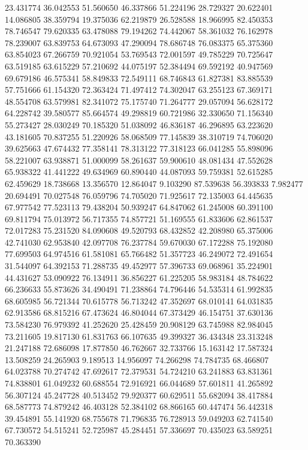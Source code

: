 23.431774
36.042553
51.560650
46.337866
51.224196
28.729327
20.622401
14.086805
38.359794
19.375036
62.219879
26.528588
18.966995
82.450353
78.746547
79.620335
63.478088
79.194262
74.442067
58.361032
76.162978
78.239007
63.839753
64.673093
47.290094
78.686748
76.083375
65.375360
63.854023
67.266759
70.921054
53.769543
72.001597
49.785229
70.725647
63.519185
63.615229
57.210692
44.075197
52.384494
69.592192
40.947569
69.679186
46.575341
58.849833
72.549111
68.746843
61.827381
83.885539
57.751666
61.154320
72.363424
71.497412
74.302047
63.255123
67.369171
48.554708
63.579981
82.341072
75.175740
71.264777
29.057094
56.628172
64.228742
39.580577
85.664574
49.298819
60.721986
32.330650
71.156340
55.273427
28.030249
70.185320
51.038092
46.836187
46.296895
63.223620
43.181605
70.837255
51.220926
58.068509
77.145839
38.310719
74.706020
39.625663
47.674432
77.358141
78.313122
77.318123
66.041285
55.898096
58.221007
63.938871
51.000099
58.261637
59.900610
48.081434
47.552628
65.938322
41.441222
49.634969
60.890440
44.087093
59.759381
52.615285
62.459629
18.738668
13.356570
12.864047
9.103290
87.539638
56.393833
7.982477
20.694491
70.027548
76.059796
74.705020
71.925617
72.135003
64.445635
67.977542
77.523113
79.438204
50.939247
64.847062
61.245008
60.391100
69.811794
75.013972
56.717355
74.857721
51.169555
61.833606
62.861537
72.017283
75.231520
84.090608
49.520793
68.432852
42.208980
65.375006
42.741030
62.953840
42.097708
76.237784
59.670030
67.172288
75.192080
77.699503
64.974516
61.581081
65.766482
51.357723
46.249072
72.491654
31.544097
64.392153
71.288735
49.452977
57.396733
69.068961
35.224901
44.431627
53.090922
76.134911
36.856227
61.225205
58.983184
48.784622
66.236633
55.873626
34.490491
71.238864
74.796446
54.535314
61.992835
68.605985
56.721344
70.615778
56.713242
47.352697
68.010141
64.031835
62.913586
68.815216
67.473624
46.804044
67.373429
46.154751
37.630136
73.584230
76.979392
41.252620
25.428459
20.908129
63.745988
82.984045
73.211605
19.817130
61.831763
66.107635
49.399327
36.434348
23.313248
21.247188
72.686098
17.877850
46.762667
32.733766
15.163142
17.587324
13.508259
24.265903
9.189513
14.956097
74.266298
74.784735
68.466807
64.023788
70.274742
47.692617
72.379531
54.724210
63.241883
63.831361
74.838801
61.049232
60.688554
72.916921
66.044689
57.601811
41.265892
56.307124
45.247728
40.513452
79.920377
60.629511
55.682094
38.417884
68.587773
74.879242
46.403128
52.384102
68.866165
60.447474
56.442318
39.454891
55.141920
68.755678
71.796835
76.728913
59.049203
62.741540
67.730572
54.515241
52.725987
45.284451
57.336697
70.435023
63.589251
70.363390

